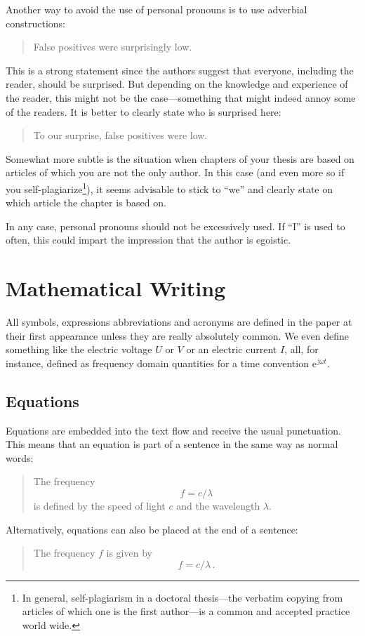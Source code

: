 Another way to avoid the use of personal pronouns is to use adverbial constructions:
\begin{quote}
    \small
    False positives were surprisingly low.
\end{quote}
This is a strong statement since the authors suggest that everyone, including the reader, should be surprised. 
But depending on the knowledge and experience of the reader, this might not be the case---something that might indeed annoy some of the readers.
It is better to clearly state who is surprised here:
\begin{quote}
    \small
    To our surprise, false positives were low.
\end{quote}

Somewhat more subtle is the situation when chapters of your thesis are based on articles of which you are not the only author.
In this case (and even more so if you self-plagiarize\footnote{In general, self-plagiarism in a doctoral thesis---the verbatim copying from articles of which one is the first author---is a common and accepted practice world wide.}), it seems advisable to stick to ``we'' and clearly state on which article the chapter is based on.

In any case, personal pronouns should not be excessively used. 
If ``I'' is used to often, this could impart the impression that the author is egoistic.
\clearpage 


\chapter{Mathematical Writing} %
All symbols, expressions abbreviations and acronyms are defined in the paper at their first appearance unless they are really absolutely common. 
We even define something like the electric voltage $U$ or $V$ or an electric current $I$, all, for instance, defined as frequency domain quantities for a time convention $\mathrm{e}^{\,\mathrm{j} \omega t}$. 

\section{Equations}\label{sec:Equations} %
Equations are embedded into the text flow and receive the usual punctuation. 
This means that an equation is part of a sentence in the same way as normal words:
\begin{quote}
    \small
    The frequency  
    \begin{equation}
        f = c /\lambda 
    \end{equation}
    is defined by the speed of light $c$ and the wavelength $\lambda$.
\end{quote}
Alternatively, equations can also be placed at the end of a sentence:
\begin{quote}
    \small
    The frequency $f$ is given by 
    \begin{equation}
        f = c /\lambda \, .
    \end{equation}
\end{quote}

